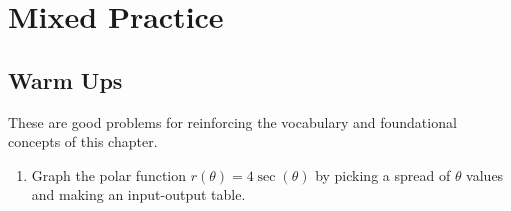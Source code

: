 \section{Mixed Practice}

\subsection{Warm Ups}
These are good problems for reinforcing the vocabulary and foundational concepts of this chapter.

\begin{exercise}{\Coffeecup \Coffeecup }

\begin{enumerate}[label=\alph*.)] 

\item  Graph the polar function $r(\theta)=4\sec(\theta)$ by picking a spread of $\theta$ values and making an input-output table.


\end{enumerate}
\end{exercise}
